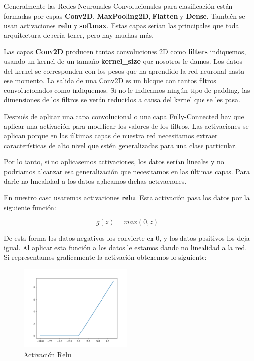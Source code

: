 \vspace{5 mm}

Generalmente las Redes Neuronales Convolucionales para clasificación están formadas por capas \textbf{Conv2D}, \textbf{MaxPooling2D}, \textbf{Flatten} y \textbf{Dense}. También se usan activaciones \textbf{relu} y \textbf{softmax}. Estas capas serían las principales que toda arquitectura debería tener, pero hay muchas más.

\vspace{2 mm}

Las capas \textbf{Conv2D} producen tantas convoluciones 2D como \textbf{filters} indiquemos, usando un kernel de un tamaño \textbf{kernel\_size} que nosotros le damos. Los datos del kernel se corresponden con los pesos que ha aprendido la red neuronal hasta ese momento. La salida de una Conv2D es un bloque con tantos filtros convolucionados como indiquemos. Si no le indicamos ningún tipo de padding, las dimensiones de los filtros se verán reducidos a causa del kernel que se les pasa.

\vspace{2 mm}

Después de aplicar una capa convolucional o una capa Fully-Connected hay que aplicar una activación para modificar los valores de los filtros. Las activaciones se aplican porque en las últimas capas de nuestra red necesitamos extraer características de alto nivel que estén generalizadas para una clase particular.

\vspace{2 mm}

Por lo tanto, si no aplicasemos activaciones, los datos serían lineales y no podriamos alcanzar esa generalización que necesitamos en las últimas capas. Para darle no linealidad a los datos aplicamos dichas activaciones. 

\vspace{2 mm}

En nuestro caso usaremos activaciones \textbf{relu}. Esta activación pasa los datos por la siguiente función:

\[g(z) = max(0, z)\]

De esta forma los datos negativos los convierte en 0, y los datos positivos los deja igual. Al aplicar esta función a los datos le estamos dando no linealidad a la red. Si representamos graficamente la activación obtenemos lo siguiente:

\vspace{5 mm}

\begin{figure}[H]
\centering
  \includegraphics[width=0.5\textwidth]{Imagenes/relu.png}
   \caption{Activación Relu}
\end{figure}

